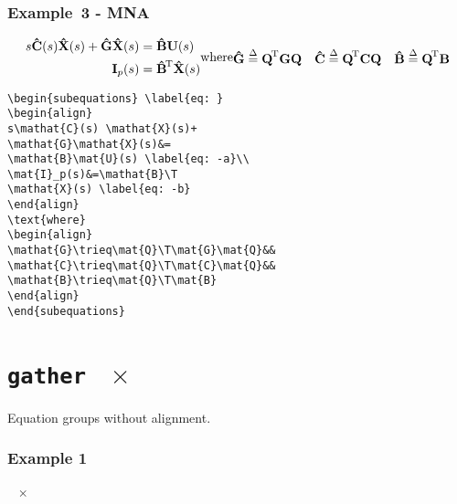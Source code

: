 \documentclass[journal]{IEEEtran}
\begin{document}
\subsubsection{Example~3 - MNA}
\begin{subequations}
	\begin{align}
	s\mathat{C}(s)\mathat{X}(s)+\mathat{G}\mathat{X}(s)&=
	\mathat{B}\mat{U}(s)\\
	\mat{I}_p(s)&=\mathat{B}\T\mathat{X}(s)
	\end{align}
	\text{where}
	\begin{align}
	\mathat{G}\trieq\mat{Q}\T\mat{G}\mat{Q}&&
	\mathat{C}\trieq\mat{Q}\T\mat{C}\mat{Q}&&
	\mathat{B}\trieq\mat{Q}\T\mat{B}
	\end{align}
\end{subequations}

\begin{verbatim}
\begin{subequations} \label{eq: }
\begin{align}
s\mathat{C}(s) \mathat{X}(s)+
\mathat{G}\mathat{X}(s)&=
\mathat{B}\mat{U}(s) \label{eq: -a}\\
\mat{I}_p(s)&=\mathat{B}\T
\mathat{X}(s) \label{eq: -b}
\end{align}
\text{where}
\begin{align}
\mathat{G}\trieq\mat{Q}\T\mat{G}\mat{Q}&&
\mathat{C}\trieq\mat{Q}\T\mat{C}\mat{Q}&&
\mathat{B}\trieq\mat{Q}\T\mat{B}
\end{align}
\end{subequations}
\end{verbatim}


\noindent \dotfill
\section{\texttt{gather}~{\color{red} \Large $\mathbf{\times}$}}
Equation groups without alignment.

\subsubsection{Example 1}~{\color{red} \Large $\mathbf{\times}$}
\end{document}
